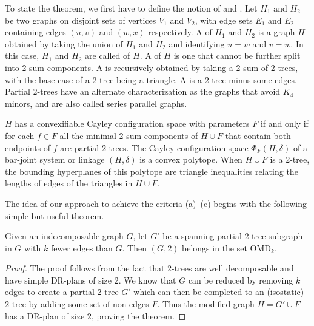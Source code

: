 To state the theorem, we first have to define the notion of  and . Let $H_1$ and $H_2$ be two graphs on disjoint sets of vertices $V_1$ and $V_2$, with edge sets $E_1$ and $E_2$ containing edges $(u,v)$ and $(w,x)$ respectively.
A  of $H_1$ and $H_2$ is a graph $H$ obtained by taking the union of $H_1$ and $H_2$ and identifying $u=w$ and $v=w$. In this case, $H_1$ and $H_2$ are called  of $H$. A  of $H$ is  one that cannot be further split into 2-sum components. A  is recursively obtained by taking a 2-sum of 2-trees, with the base case of a 2-tree being a triangle. A  is a 2-tree minus some edges. Partial 2-trees have an alternate characterization as the graphs that avoid $K_4$ minors, and are also called series parallel graphs.

\begin{theorem}\label{theorem:convexcayley}
    \cite{sitharam2010convex} $H$ has a convexifiable Cayley configuration space  with parameters $F$ if and only if for each $f\in F$  all the minimal 2-sum components of $H\cup F$ that contain both endpoints of $f$ are partial 2-trees. The Cayley configuration space $\Phi_F(H,\delta)$ of a bar-joint system or linkage $(H,\delta)$ is a convex polytope. When $H\cup F$ is a 2-tree, the bounding hyperplanes of this polytope are triangle inequalities relating the lengths of edges of the triangles in $H\cup F$.
\end{theorem}

The idea of our approach to achieve the criteria (a)--(c) begins with the following simple but useful theorem.

\begin{theorem}\label{theorem:omdk}
    Given an indecomposable graph $G$, let $G'$ be a spanning partial 2-tree subgraph in $G$ with $k$ fewer edges than $G$. Then $(G,2)$ belongs in the set OMD$_k$.
\end{theorem}


\begin{proof}
    The proof follows from the fact that 2-trees are well decomposable and have simple DR-plans of size 2. We know that $G$ can be reduced by removing $k$ edges to create a partial-2-tree $G'$ which can then be completed to an (isostatic) 2-tree by adding some set of non-edges $F$. Thus the modified graph $H = G'\cup F$ has  a DR-plan of size 2, proving the theorem.
\end{proof}

